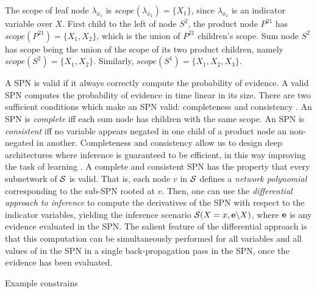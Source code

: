 \begin{example}
The scope of leaf node $\lambda_{\bar{x}_1}$ is $scope(\lambda_{\bar{x}_1}) = \{X_1\}$, since $\lambda_{\bar{x}_1}$ is an indicator variable over $X$.
First child to the left of node $S^2$, the product node $P^{21}$ has $scope(P^{21}) = \{X_1, X_2\}$, which is the union of $P^{21}$ children's scope.
Sum node $S^2$ has scope being the union of the scope of its two product children, namely $scope(S^2) = \{X_1,X_2\}$.
Similarly, $scope(S^1) = \{X_1,X_2,X_3\}$.
\end{example}



A SPN is valid if it always correctly compute the probability of evidence.
A valid SPN computes the probability of evidence in time linear in its size.
There are two sufficient conditions which make an SPN valid: completeness and consistency \cite{poon2011sum}.
An SPN is \emph{complete} iff each sum node has children with the same scope.
An SPN is \emph{consistent} iff no variable appears negated in one child of a product node an non-negated in another.
Completeness and consistency allow us to design deep architectures where inference is guaranteed to be efficient, in this way improving the task of learning \cite{poon2011sum}. 
A complete and consistent SPN has the property that every subnetwork of $\cal S$ is valid.
That is, each node $v$ in $\cal S$ defines a \emph{network polynomial} \cite{poon2011sum} corresponding to the sub-SPN rooted at $v$.
Then, one can use the \emph{differential approach to inference} \cite{poon2011sum,darwiche2003differential,peharz2015theoretical} to compute the derivatives of the SPN with respect to the indicator variables, yielding the inference scenario ${\cal S}(X=x,{\bf e}\backslash X)$, where ${\bf e}$ is any evidence evaluated in the SPN.
The salient feature of the differential approach is that this computation can be simultaneously performed for all variables and all values of in the SPN in a single back-propagation pass in the SPN, once the evidence has been evaluated.


\begin{example}
Example constrains	
\end{example}

